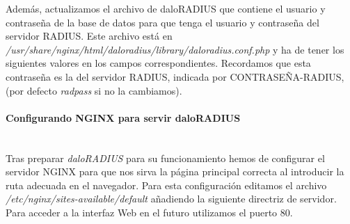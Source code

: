 
Además, actualizamos el archivo de daloRADIUS que contiene el usuario y contraseña de la base de datos para que tenga el usuario y contraseña del servidor RADIUS. Este archivo está en \emph{/usr/share/nginx/html/daloradius/library/daloradius.conf.php} y ha de tener los siguientes valores en los campos correspondientes. Recordamos que esta contraseña es la del servidor RADIUS, indicada por CONTRASEÑA-RADIUS, (por defecto \emph{radpass} si no la cambiamos).


\paragraph{Configurando NGINX para servir daloRADIUS} \label{NGINXdaloRADIUS} ~\\

Tras preparar \emph{daloRADIUS} para su funcionamiento hemos de configurar el servidor NGINX para que nos sirva la página principal correcta al introducir la ruta adecuada en el navegador. Para esta configuración editamos el archivo \emph{/etc/nginx/sites-available/default} añadiendo la siguiente directriz de servidor. Para acceder a la interfaz Web en el futuro utilizamos el puerto 80.

